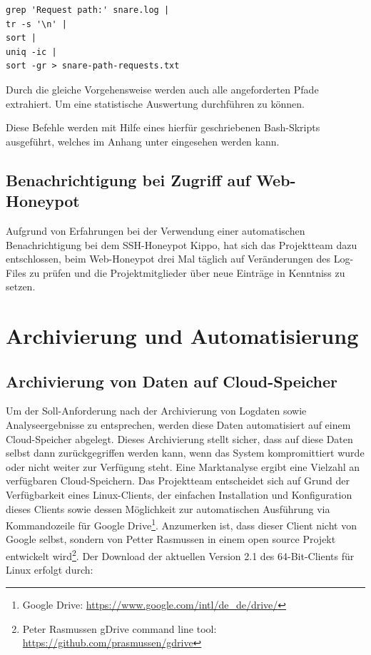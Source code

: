 \begin{lstlisting}[style=customc]
grep 'Request path:' snare.log |
tr -s '\n' |
sort |
uniq -ic |
sort -gr > snare-path-requests.txt
\end{lstlisting}

Durch die gleiche Vorgehensweise werden auch alle angeforderten Pfade extrahiert. Um eine statistische Auswertung durchführen zu können.

Diese Befehle werden mit Hilfe eines hierfür geschriebenen Bash-Skripts ausgeführt, welches im Anhang unter \textit{} eingesehen werden kann.


\subsection{Benachrichtigung bei Zugriff auf Web-Honeypot}
\label{subsec:Installation und Konfiguration SNARE}

Aufgrund von Erfahrungen bei der Verwendung einer automatischen Benachrichtigung bei dem SSH-Honeypot Kippo, hat sich das Projektteam dazu entschlossen, beim Web-Honeypot drei Mal täglich auf Veränderungen des Log-Files zu prüfen und die Projektmitglieder über neue Einträge in Kenntniss zu setzen.


\section{Archivierung und Automatisierung}
\label{sec:Archivierung und Automatisierung}


\subsection{Archivierung von Daten auf Cloud-Speicher}
\label{subsec:Archivierung von Daten auf Cloud-Speicher}

Um der Soll-Anforderung nach der Archivierung von Logdaten sowie Analyseergebnisse zu entsprechen, werden diese Daten automatisiert auf einem Cloud-Speicher abgelegt. Dieses Archivierung stellt sicher, dass auf diese Daten selbst dann zurückgegriffen werden kann, wenn das System kompromittiert wurde oder nicht weiter zur Verfügung steht. Eine Marktanalyse ergibt eine Vielzahl an verfügbaren Cloud-Speichern. Das Projektteam entscheidet sich auf Grund der Verfügbarkeit eines Linux-Clients, der einfachen Installation und Konfiguration dieses Clients sowie dessen Möglichkeit zur automatischen Ausführung via Kommandozeile für Google Drive\footnote{ Google Drive: \url{https://www.google.com/intl/de_de/drive/}}. Anzumerken ist, dass dieser Client nicht von Google selbst, sondern von Petter Rasmussen in einem open source Projekt entwickelt wird\footnote{ Peter Rasmussen gDrive command line tool: \url{https://github.com/prasmussen/gdrive}}. Der Download der aktuellen Version 2.1 des 64-Bit-Clients für Linux erfolgt durch:

